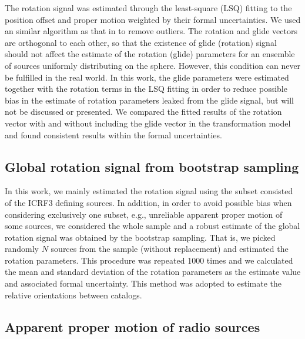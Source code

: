\documentclass{aa}
\begin{document}
    The rotation signal was estimated through the least-square (LSQ) fitting to the position offset and proper motion weighted by their formal uncertainties.
    We used an similar algorithm as that in \citet[][]{2020A&A...634A..28L} to remove outliers.
    The rotation and glide vectors are orthogonal to each other, so that the existence of glide (rotation) signal should not affect the estimate of the rotation (glide) parameters for an ensemble of sources uniformly distributing on the sphere.
    However, this condition can never be fulfilled in the real world.
    In this work, the glide parameters were estimated together with the rotation terms in the LSQ fitting in order to reduce possible bias in the estimate of rotation parameters leaked from the glide signal, but will not be discussed or presented.
    We compared the fitted results of the rotation vector with and without including the glide vector in the transformation model and found consistent results within the formal uncertainties.
    

\subsection{Global rotation signal from bootstrap sampling}  \label{subsec:bs-mathod}
    
    In this work, we mainly estimated the rotation signal using the subset consisted of the ICRF3 defining sources.
    In addition, in order to avoid possible bias when considering exclusively one subset, e.g., unreliable apparent proper motion of some sources, we considered the whole sample and a robust estimate of the global rotation signal was obtained by the bootstrap sampling.
    That is, we picked randomly $N$ sources from the sample (without replacement) and estimated the rotation parameters.
    This procedure was repeated 1000 times and we calculated the mean and standard deviation of the rotation parameters as the estimate value and associated formal uncertainty.
    This method was adopted to estimate the relative orientations between catalogs.
   

\subsection{Apparent proper motion of radio sources}  \label{subsec:apm-data}
\end{document}

